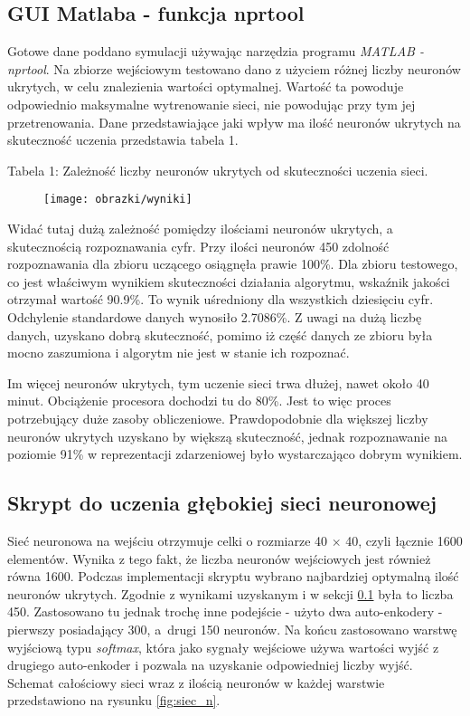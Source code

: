 \subsection{GUI Matlaba - funkcja nprtool}
\label{sub:funkcja}

Gotowe dane poddano symulacji używając narzędzia programu \textit{MATLAB - nprtool}. Na zbiorze wejściowym testowano dano z użyciem różnej liczby neuronów ukrytych, w celu znalezienia wartości optymalnej. Wartość ta powoduje odpowiednio maksymalne wytrenowanie sieci, nie powodując przy tym jej przetrenowania. Dane przedstawiające jaki wpływ ma ilość neuronów ukrytych na skuteczność uczenia przedstawia tabela 1.

\begin{center}
Tabela 1: Zależność liczby neuronów ukrytych od skuteczności uczenia sieci.
\begin{figure}[H]
	\centering
	\texttt{[image: obrazki/wyniki]}
\end{figure}
\end{center}

\noindent Widać tutaj dużą zależność pomiędzy ilościami neuronów ukrytych, a skutecznością rozpoznawania cyfr. Przy ilości neuronów 450 zdolność rozpoznawania dla zbioru uczącego osiągnęła prawie 100\%. Dla zbioru testowego, co jest właściwym wynikiem skuteczności działania algorytmu, wskaźnik jakości otrzymał wartość 90.9\%. To wynik uśredniony dla wszystkich dziesięciu cyfr. Odchylenie standardowe danych wynosiło 2.7086\%. Z uwagi na dużą liczbę danych, uzyskano dobrą skuteczność, pomimo iż część danych ze zbioru była mocno zaszumiona i algorytm nie jest w stanie ich rozpoznać. 


\noindent Im więcej neuronów ukrytych, tym uczenie sieci trwa dłużej, nawet około 40 minut. Obciążenie procesora dochodzi tu do 80\%. Jest to więc proces potrzebujący duże zasoby obliczeniowe. Prawdopodobnie dla większej liczby neuronów ukrytych uzyskano by większą skuteczność, jednak rozpoznawanie na poziomie 91\% w reprezentacji zdarzeniowej było wystarczająco dobrym wynikiem.

\subsection{Skrypt do uczenia głębokiej sieci neuronowej}
\label{sub:skrypt}

Sieć neuronowa na wejściu otrzymuje celki o rozmiarze 40 $\times$ 40, czyli łącznie 1600 elementów. Wynika z tego fakt, że liczba neuronów wejściowych jest również równa 1600. Podczas implementacji skryptu wybrano najbardziej optymalną ilość neuronów ukrytych. Zgodnie z wynikami uzyskanym i w sekcji \ref{sub:funkcja} była to liczba 450. Zastosowano tu jednak trochę inne podejście - użyto dwa auto-enkodery - pierwszy posiadający 300, a~drugi 150 neuronów. Na końcu zastosowano warstwę wyjściową typu \textit{softmax}, która jako sygnały wejściowe używa wartości wyjść z drugiego auto-enkoder i pozwala na uzyskanie odpowiedniej liczby wyjść. Schemat całościowy sieci wraz z ilością neuronów w każdej warstwie przedstawiono na rysunku \ref{fig:siec_n}.

